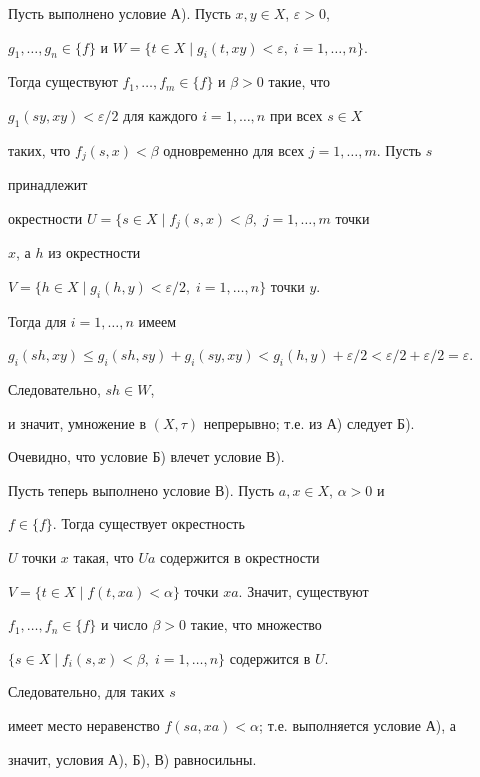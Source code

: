 \begin{pf} Пусть выполнено условие А). Пусть $x,y\in X$, $\varepsilon>0$, 


$g_1,\dotsc,g_n\in \{f\}$ и $W=\{t\in X\mid 


g_i(t,xy)<\varepsilon,\;i=1,\dotsc,n\}.$


Тогда существуют $f_1,\dotsc,f_m\in\{f\}$ и $\beta>0$ такие, что 


$g_1(sy,xy)<\varepsilon/2$ для каждого $i=1,\dotsc,n$ при всех $s\in X$ 


таких, что $f_j(s,x)<\beta$ одновременно для всех $j=1,\dotsc,m$. Пусть $s$ 


принадлежит 


окрестности $U=\{s\in X\mid f_j(s,x)<\beta,\;j=1,\dotsc,m$ точки 


$x$, а $h$ из окрестности 


$V=\{h\in X\mid g_i(h,y)<\varepsilon/2,\;i=1,\dotsc,n\}$ точки $y$. 


Тогда для $i=1,\dotsc,n$ имеем 


$g_i(sh,xy)\le g_i(sh,sy)+g_i(sy,xy)<g_i(h,y)+\varepsilon/2< 


\varepsilon/2+\varepsilon/2=\varepsilon$. 


Следовательно, $sh\in W$, 


и значит, умножение в $(X,\tau)$ непрерывно; т.е. из А) следует Б). 


 


Очевидно, что условие Б) влечет условие В). 


 


Пусть теперь выполнено условие В). Пусть $a,x\in X$, $\alpha>0$ и 


$f\in\{f\}$. Тогда существует окрестность 


$U$ точки $x$ такая, что $Ua$ содержится в окрестности 


$V=\{t\in X\mid f(t,xa)<\alpha\}$ точки $xa$. Значит, существуют 


$f_1,\dotsc,f_n\in\{f\}$ и число $\beta>0$ такие, что множество 


$\{s\in X\mid f_i(s,x)<\beta,\;i=1,\dotsc,n\}$ содержится в $U$. 


Следовательно, для таких $s$ 


имеет место неравенство $f(sa,xa)<\alpha$; т.е. выполняется условие А), а 


значит, условия А), Б), В) равносильны. 



\end{pf}
